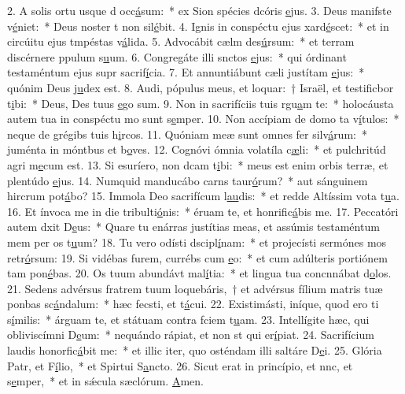 2. A solis ortu usque d occ\uline{á}sum:~* ex Sion spécies dcóris \uline{e}jus.
3. Deus manifste v\uline{é}niet:~* Deus noster t non sil\uline{é}bit.
4. Ignis in conspéctu ejus xard\uline{é}scet:~* et in circúitu ejus tmpéstas v\uline{á}lida.
5. Advocábit cælm des\uline{ú}rsum:~* et terram discérnere ppulum s\uline{u}um.
6. Congregáte illi snctos \uline{e}jus:~* qui órdinant testaméntum ejus supr sacrif\uline{í}cia.
7. Et annuntiábunt cæli justítam \uline{e}jus:~* quónim Deus j\uline{u}dex est.
8. Audi, pópulus meus, et loquar:~† Israël, et testificbor t\uline{i}bi:~* Deus, Des tuus \uline{e}go sum.
9. Non in sacrifíciis tuis rgu\uline{a}m te:~* holocáusta autem tua in conspéctu mo sunt s\uline{e}mper.
10. Non accípiam de domo ta v\uline{í}tulos:~* neque de grégibs tuis h\uline{i}rcos.
11. Quóniam meæ sunt omnes fer silv\uline{á}rum:~* juménta in móntbus et b\uline{o}ves.
12. Cognóvi ómnia volatíla c\uline{æ}li:~* et pulchritúd agri m\uline{e}cum est.
13. Si esuríero, non dcam t\uline{i}bi:~* meus est enim orbis terræ, et plentúdo \uline{e}jus.
14. Numquid manducábo carns taur\uline{ó}rum?~* aut sánguinem hircrum pot\uline{á}bo?
15. Immola Deo sacrifícum l\uline{au}dis:~* et redde Altíssim vota t\uline{u}a.
16. Et ínvoca me in die tribulti\uline{ó}nis:~* éruam te, et honrific\uline{á}bis me.
17. Peccatóri autem dxit D\uline{e}us:~* Quare tu enárras justítias meas, et assúmis testaméntum mem per os t\uline{u}um?
18. Tu vero odísti dscipl\uline{í}nam:~* et projecísti sermónes mos retr\uline{ó}rsum:
19. Si vidébas furem, currébs cum \uline{e}o:~* et cum adúlteris portiónem tam pon\uline{é}bas.
20. Os tuum abundávt mal\uline{í}tia:~* et lingua tua concnnábat d\uline{o}los.
21. Sedens advérsus fratrem tuum loquebáris,~† et advérsus fílium matris tuæ ponbas sc\uline{á}ndalum:~* hæc fecsti, et t\uline{á}cui.
22. Existimásti, iníque, quod ero ti s\uline{í}milis:~* árguam te, et státuam contra fciem t\uline{u}am.
23. Intellígite hæc, qui obliviscímni D\uline{e}um:~* nequándo rápiat, et non st qui er\uline{í}piat.
24. Sacrifícium laudis honorfic\uline{á}bit me:~* et illic iter, quo osténdam illi saltáre D\uline{e}i.
25. Glória Patr, et F\uline{í}lio,~* et Spirtui S\uline{a}ncto.
26. Sicut erat in princípio, et nnc, et s\uline{e}mper,~* et in sǽcula sæclórum. \uline{A}men.
